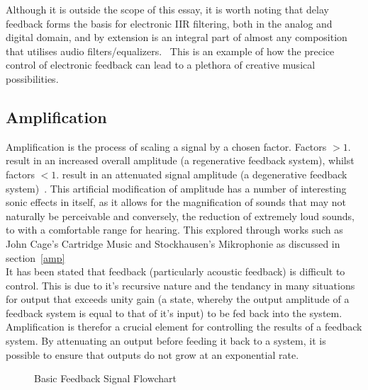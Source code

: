 \documentclass[titlepage]{scrartcl}
\begin{document}
    Although it is outside the scope of this essay, it is worth noting that
    delay feedback forms the basis for electronic IIR filtering, both in the
    analog and digital domain, and by extension is an integral part of almost
    any composition that utilises audio
    filters/equalizers.~\parencite[p.71-72]{zolzer2011dafx} This is an example
    of how the precice control of electronic feedback can lead to a plethora of
    creative musical possibilities.

    \subsection{Amplification}
    Amplification is the process of scaling a signal by a chosen factor.
    Factors $>1.$ result in an increased overall amplitude (a regenerative
    feedback system), whilst factors
    $<1.$ result in an attenuated signal amplitude (a degenerative feedback
    system)~\parencite[p.3-4]{kadis2012sosr}. 
    This artificial modification of amplitude has a number of interesting sonic
    effects in itself, as it allows for the magnification of sounds that may not
    naturally be perceivable and conversely, the reduction of extremely loud
    sounds, to with a comfortable range for hearing. This explored through
    works such as John Cage's Cartridge Music and Stockhausen's Mikrophonie as
    discussed in section~\ref{amp}\\

    It has been stated that feedback (particularly acoustic feedback) is
    difficult to control. This is due to it's recursive nature and the tendancy
    in many situations for output that exceeds unity gain (a state, whereby the
    output amplitude of a feedback system is equal to that of it's input) to be
    fed back into the system. Amplification is therefor a crucial element for
    controlling the results of a feedback system. By attenuating an output
    before feeding it back to a system, it is possible to ensure that outputs
    do not grow at an exponential rate.~\parencite[p.71-72]{zolzer2011dafx}
    \begin{figure}
        \caption[Caption for LOF]{Basic Feedback Signal Flowchart\protect\footnotemark}
        \label{feed_flowchart}
    \end{figure}

\end{document}
